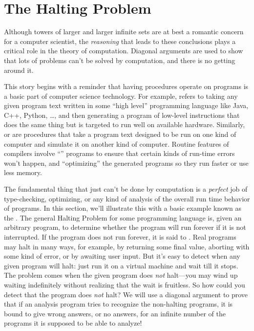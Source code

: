 \section{The Halting Problem}\label{halting_sec}

Although towers of larger and larger infinite sets are at best a
romantic concern for a computer scientist, the \emph{reasoning} that
leads to these conclusions plays a critical role in the theory of
computation.  Diagonal arguments are used to show that lots of
problems can't be solved by computation, and there is no getting
around it.

This story begins with a reminder that having procedures operate on
programs is a basic part of computer science technology.  For example,
\emph{} refers to taking any given program text
written in some ``high level'' programming language like Java, C++,
Python, \dots, and then generating a program of low-level instructions
that does the same thing but is targeted to run well on available
hardware.  Similarly, \emph{} or \emph{} are procedures that take a program text designed to be
run on one kind of computer and simulate it on another kind of
computer.  Routine features of compilers involve
``'' programs to ensure that certain kinds of
run-time errors won't happen, and ``optimizing'' the generated
programs so they run faster or use less memory.

The fundamental thing that just can't be done by
computation is a \emph{perfect} job of type-checking, optimizing, or
any kind of analysis of the overall run time behavior of programs.  In
this section, we'll illustrate this with a basic example known as the
.  The general Halting Problem for some
programming language is, given an arbitrary program, to determine whether
the program will run forever if it is not interrupted.  If the program
does not run forever, it is said to .  Real programs may
halt in many ways, for example, by returning some final value,
aborting with some kind of error, or by awaiting user input.  But it's
easy to detect when any given program will halt: just run it on a
virtual machine and wait till it stops.  The problem comes when the
given program does \emph{not} halt---you may wind up waiting
indefinitely without realizing that the wait is fruitless.  So how
could you detect that the program does \emph{not} halt?  We will use a
diagonal argument to prove that if an analysis program tries to
recognize the non-halting programs, it is bound to give wrong answers,
or no answers, for an infinite number of the programs it is supposed to be
able to analyze!

